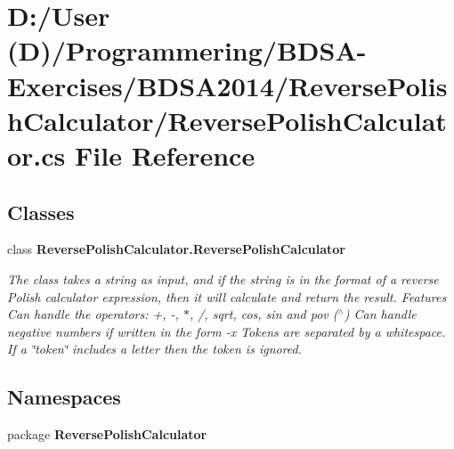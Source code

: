 \section{D\+:/\+User (D)/\+Programmering/\+B\+D\+S\+A-\/\+Exercises/\+B\+D\+S\+A2014/\+Reverse\+Polish\+Calculator/\+Reverse\+Polish\+Calculator.cs File Reference}
\label{_reverse_polish_calculator_8cs}
\subsection*{Classes}
\begin{DoxyCompactItemize}
\item 
class {\bf Reverse\+Polish\+Calculator.\+Reverse\+Polish\+Calculator}
\begin{DoxyCompactList}\small\item\em The class takes a string as input, and if the string is in the format of a reverse Polish calculator expression, then it will calculate and return the result. Features Can handle the operators\+: +, -\/, $\ast$, /, sqrt, cos, sin and pov ($^\wedge$) Can handle negative numbers if written in the form -\/x Tokens are separated by a whitespace. If a \char`\"{}token\char`\"{} includes a letter then the token is ignored. \end{DoxyCompactList}\end{DoxyCompactItemize}
\subsection*{Namespaces}
\begin{DoxyCompactItemize}
\item 
package {\bf Reverse\+Polish\+Calculator}
\end{DoxyCompactItemize}
